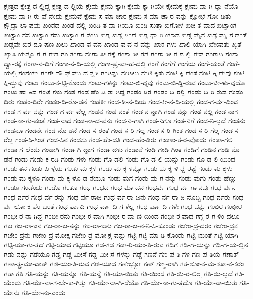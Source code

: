 {ಕ್ಷೇತ್ರದ
ಕ್ಷೇತ್ರ-ದ-ಲ್ಲಿದ್ದ
ಕ್ಷೇತ್ರ-ದ-ಲ್ಲಿಯೆ
ಕ್ಷೇಮ
ಕ್ಷೇಮ-ಕ್ಕಾಗಿ
ಕ್ಷೇಮ-ಕ್ಕಾ-ಗಿಯೇ
ಕ್ಷೇಮಕ್ಕೆ
ಕ್ಷೇಮ-ವಾ-ಗಿ-ದ್ದಾ-ನೆಯೊ
ಕ್ಷೇಮ-ವಾ-ಗಿ-ರು-ವೆ-ನೆಂದು
ಕ್ಷೇಮವೆ
ಕ್ಷೇಮ-ಸ-ಮಾ-ಚಾರ
ಕ್ಷೇಮ-ಸ-ಮಾ-ಚಾ-ರ-ವನ್ನು
ಕ್ಷೋಭೆ-ಗೊಂ-ಡಿತು
ಕ್ಷೌದ್ರಾ-ಲಾ-ಪಯ
ಖಂಡದ
ಖಂಡ-ದಲ್ಲಿ
ಖಂಡಿ-ತ-ವಾ-ಗಿಯೂ
ಖಂಡಿ-ಸುತ್ತಾ
ಖಗೋಳ
ಖಚಿ-ತ-ವಾದ
ಖಟ್ವಾಂಗ
ಖಟ್ವಾಂ-ಗನ
ಖಟ್ವಾಂ-ಗನು
ಖಟ್ವಾಂ-ಗ-ನೆಂಬ
ಖಡ್ಗ
ಖಡ್ಗ-ದಿಂದ
ಖಡ್ಗ-ಧಾ-ರಿ-ಯಾದ
ಖಡ್ಗ-ಮೃಗ
ಖಡ್ಗ-ಮೃ-ಗ-ದಂತೆ
ಖಡ್ಗವೇ
ಖರ-ದೂ-ಷಣ
ಖಲು
ಖಾಂಡ-ವ-ವನ
ಖಾಂಡ-ವ-ವ-ನ-ವನ್ನು
ಖಾರ-ಗಳು
ಖಾಲಿ-ಯಾಗಿ
ಖೇಽವತು
ಖ್ಯತೆ
ಖ್ಯಾತಿ-ಯನ್ನೂ
ಗ-ಗ-ರುಡ
ಗಂ
ಗಂಗಾ
ಗಂಗಾ-ತೀ-ರಕ್ಕೆ
ಗಂಗಾ-ತೀ-ರದ
ಗಂಗಾ-ತೀ-ರ-ದ-ಲ್ಲಿ-ರುವ
ಗಂಗಾದಿ
ಗಂಗಾ-ದ್ವಾ-ರಕ್ಕೆ
ಗಂಗಾ-ನ-ದಿಗೆ
ಗಂಗಾ-ನ-ದಿ-ಯಲ್ಲಿ
ಗಂಗಾ-ಪ್ರ-ವಾ-ಹ-ದಲ್ಲಿ
ಗಂಗೆ
ಗಂಗೆಗೆ
ಗಂಗೆಯ
ಗಂಗೆ-ಯಂತೆ
ಗಂಗೆ-ಯಲ್ಲಿ
ಗಂಗೆಯು
ಗಂಗೇ-ವೌ-ಘ-ಮು-ದ-ನ್ವತಿ
ಗಂಟನ್ನು
ಗಂಟಲು
ಗಂಟಿ-ಕ್ಕಿತು
ಗಂಟಿ-ಕ್ಕಿ-ದಂತೆ
ಗಂಟಿ-ಕ್ಕಿ-ದುವು
ಗಂಟಿ-ಕ್ಕಿ-ದ್ದುವು
ಗಂಟು
ಗಂಟು-ಕ-ಟ್ಟಿ-ಕೊಂಡು
ಗಂಟು-ಗಳನ್ನು
ಗಂಟು-ಬಿ-ದ್ದವು
ಗಂಟು-ಬಿ-ದ್ದಿ-ರುವ
ಗಂಟು-ಬೀ-ಳು-ವುದೊ
ಗಂಟು-ಹಾ-ಕಿದ
ಗಂಟೆ-ಗಳು
ಗಂಡ
ಗಂಡ-ಹೆಂ-ಡಿ-ರಾ-ಗಿದ್ದ
ಗಂಡಂ-ದಿರ
ಗಂಡಂ-ದಿ-ರಲ್ಲಿ
ಗಂಡಂ-ದಿ-ರಿ-ರುವ
ಗಂಡಂ-ದಿರು
ಗಂಡಂ-ದಿರೇ
ಗಂಡಂ-ದಿ-ರೊ-ಡನೆ
ಗಂಡಕೀ
ಗಂಡ-ಕೀ-ನ-ದಿಯ
ಗಂಡ-ಕೀ-ನ-ದಿ-ಯಲ್ಲಿ
ಗಂಡ-ಗ-ರ್ವ-ದಿಂದ
ಗಂಡ-ಗ-ರ್ವ-ವನ್ನು
ಗಂಡ-ಗ-ರ್ವ-ವೆಲ್ಲ
ಗಂಡನ
ಗಂಡ-ನಂತೆ
ಗಂಡ-ನ-ನ್ನಾಗಿ
ಗಂಡ-ನನ್ನು
ಗಂಡ-ನಲ್ಲಿ
ಗಂಡ-ನಾಗ
ಗಂಡ-ನಾ-ಗು-ವಂತೆ
ಗಂಡ-ನಾದ
ಗಂಡ-ನಾ-ದ-ವನು
ಗಂಡ-ನಿ-ಗಾಗಿ
ಗಂಡ-ನಿಗೂ
ಗಂಡ-ನಿಗೆ
ಗಂಡ-ನಿ-ಲ್ಲದೆ
ಗಂಡನು
ಗಂಡನೂ
ಗಂಡನೇ
ಗಂಡ-ನೊ-ಡನೆ
ಗಂಡ-ಸ-ರಂತೆ
ಗಂಡ-ಸ-ರಿ-ಗಲ್ಲ
ಗಂಡ-ಸ-ರಿ-ಗಿಂತ
ಗಂಡ-ಸ-ರಿ-ಗೆಲ್ಲ
ಗಂಡ-ಸ-ರೆಲ್ಲ
ಗಂಡ-ಸಿ-ಗಿಂತ
ಗಂಡ-ಸಿನ
ಗಂಡಸು
ಗಂಡ-ಹೆಂ-ಡತಿ
ಗಂಡ-ಹೆಂ-ಡಿರು
ಗಂಡಾಂ-ತ-ರ-ವೊಂದು
ಗಂಡಾ-ಗಲಿ
ಗಂಡಾ-ಗ-ಲೆಂದು
ಗಂಡಾಗಿ
ಗಂಡಾ-ಗಿ-ದ್ದಾಗ
ಗಂಡಾ-ದಳು
ಗಂಡಾನೆ
ಗಂಡಿ
ಗಂಡಿ-ಗಿಂತ
ಗಂಡಿಗೆ
ಗಂಡಿನ
ಗಂಡಿ-ನೊ-ಡನೆ
ಗಂಡು
ಗಂಡು-ಕ-ರಡಿ
ಗಂಡು-ಗಳು
ಗಂಡು-ಗೊ-ಡಲಿ
ಗಂಡು-ಗೊ-ಡ-ಲಿ-ಯನ್ನು
ಗಂಡು-ಗೊ-ಡ-ಲಿ-ಯಿಂದ
ಗಂಡು-ತನ
ಗಂಡು-ಪಿ-ಳ್ಳೆಯ
ಗಂಡು-ಮ-ಕ್ಕಳ
ಗಂಡು-ಮ-ಕ್ಕ-ಳನ್ನೂ
ಗಂಡು-ಮ-ಕ್ಕ-ಳಿ-ದ್ದ-ರಷ್ಟೆ
ಗಂಡು-ಮ-ಕ್ಕಳು
ಗಂಡು-ಮ-ಕ್ಕಳೂ
ಗಂಡು-ಮ-ಕ್ಕ-ಳೊ-ಡ-ನೆಯೂ
ಗಂಡು-ಮಗ
ಗಂಡು-ಮ-ಗ-ನನ್ನು
ಗಂಡು-ಮಗು
ಗಂಡು-ಹೆಣ್ಣು
ಗಂಡೂ
ಗಂಡೆಂದು
ಗಂಡೊ
ಗಂತೂ
ಗಂಧ
ಗಂಧದ
ಗಂಧ-ಮಾ-ದನ
ಗಂಧರ್ವ
ಗಂಧ-ರ್ವ-ಗಾ-ನವು
ಗಂಧ-ರ್ವನ
ಗಂಧ-ರ್ವರ
ಗಂಧ-ರ್ವ-ರನ್ನು
ಗಂಧ-ರ್ವ-ರಾಜ
ಗಂಧ-ರ್ವ-ರಾ-ಜನು
ಗಂಧ-ರ್ವ-ರಾ-ಜ-ನೊಬ್ಬ
ಗಂಧ-ರ್ವರು
ಗಂಧ-ರ್ವ-ಲೋ-ಕ-ವೆಂ-ಬಂತೆ
ಗಂಧ-ರ್ವಾದಿ
ಗಂಧ-ರ್ವಾ-ದಿ-ಗ-ಳೆಲ್ಲ
ಗಂಧ-ರ್ವಾ-ದಿ-ಗಳೇ
ಗಂಧ-ವನ್ನು
ಗಂಭಿರ
ಗಂಭೀರ
ಗಂಭೀ-ರ-ನಾ-ಗಿದ್ದ
ಗಂಭೀ-ರನು
ಗಂಭೀ-ರ-ವಾಗಿ
ಗಂಭೀ-ರ-ವಾ-ಣಿ-ಯಿಂದ
ಗಂಭೀ-ರ-ವಾದ
ಗಗ್ಗ-ರ-ಗ-ಳಿಂ-ದಲೂ
ಗಜ
ಗಜ-ರಾ-ಜನ
ಗಜ-ರಾ-ಜ-ನನ್ನು
ಗಜ-ರಾ-ಜನು
ಗಜ-ರಾ-ಜ-ನೆ-ನಿ-ಸಿ-ಕೊಂಡು
ಗಜೇಂ-ದ್ರ-ದರಂ
ಗಜೇಂ-ದ್ರನ
ಗಜೇಂ-ದ್ರನು
ಗಜೇಂ-ದ್ರ-ಮೋಕ್ಷ
ಗಜೇಂ-ದ್ರ-ಮೋ-ಕ್ಷ-ವನ್ನು
ಗಟ್ಟಿ
ಗಟ್ಟಿ-ಮಾ-ಡಿ-ಕೊಂಡು
ಗಟ್ಟಿ-ಯಂತೆ
ಗಟ್ಟಿ-ಯಾಗಿ
ಗಟ್ಟಿ-ಯಾ-ಗು-ತ್ತದೆ
ಗಟ್ಟಿ-ಯಾದ
ಗಟ್ಟಿಯೂ
ಗಡ-ಗಡ
ಗಡಾ-ರಿ-ಯಂ-ತಿ-ರುವ
ಗಡಿಗೆ
ಗಡಿ-ಗೆ-ಯನ್ನು
ಗಡಿ-ಗೆ-ಯ-ಲ್ಲಿನ
ಗಡು-ವನ್ನು
ಗಡೆಯೂ
ಗಡ್ಡ
ಗಡ್ಡ-ಮೀಸೆ
ಗಡ್ಡ-ಮೀ-ಸೆ-ಗಳನ್ನು
ಗಡ್ಡೆ
ಗಣನೆ
ಗಣ-ಪ-ತಿ-ಗಳ
ಗಣ-ಪ-ತಿಯ
ಗಣಾತ್
ಗಣಾ-ತ್ಪ್ರ-ಮಾ-ದಾತ್
ಗಣಿ-ಯಂ-ತಿ-ರುವ
ಗಣಿ-ಯಾದ
ಗಣೇಭ್ಯೋ
ಗಣ್
ಗಣ್ಣ-ರಾಗಿ
ಗತ-ಶೋ-ಕ-ಮ-ಶೋ-ಕ-ಕರಂ
ಗತಾ
ಗತಿ
ಗತಿ-ಯನ್ನು
ಗತಿ-ಯನ್ನೂ
ಗತಿ-ಯನ್ನೆ
ಗತಿ-ಯಾ-ಯಿತು
ಗತಿ-ಯಿಂದ
ಗತಿ-ಯಿ-ರ-ಲಿಲ್ಲ
ಗತಿ-ಯಿ-ಲ್ಲದೆ
ಗತಿ-ಯೆಂದು
ಗತಿ-ಯೇ-ನಾ-ಗ-ಬೇ-ಕಾ-ಗಿತ್ತು
ಗತಿ-ಯೇ-ನಾ-ಗಿ-ದೆಯೊ
ಗತಿ-ಯೇ-ನಾ-ಗು-ತ್ತದೊ
ಗತಿ-ಯೇ-ನಾ-ಯಿತು
ಗತಿ-ಯೇನು
ಗತಿ-ಯೇ-ನು-ಎಂದು
}
